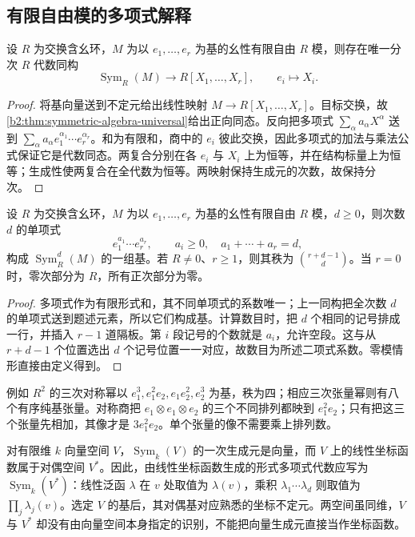\subsection{有限自由模的多项式解释}
\label{b2:subsec:0803:02}

\begin{theorem}[多项式解释]\label{b2:thm:symmetric-polynomial-algebra}
	设 \(R\) 为交换含幺环，\(M\) 为以 \(e_1,\ldots,e_r\) 为基的幺性有限自由 \(R\) 模，则存在唯一分次 \(R\) 代数同构
	\[
		\operatorname{Sym}_R(M)\longrightarrow R[X_1,\ldots,X_r], \qquad e_i\longmapsto X_i.
	\]
\end{theorem}
\begin{proof}
	将基向量送到不定元给出线性映射 \(M\rightarrow R[X_1,\ldots,X_r]\)。目标交换，故\cref{b2:thm:symmetric-algebra-universal}给出正向同态。反向把多项式 \(\sum_\alpha a_\alpha X^\alpha\) 送到 \(\sum_\alpha a_\alpha e_1^{\alpha_1}\cdots e_r^{\alpha_r}\)。和为有限和，商中的 \(e_i\) 彼此交换，因此多项式的加法与乘法公式保证它是代数同态。两复合分别在各 \(e_i\) 与 \(X_i\) 上为恒等，并在结构标量上为恒等；生成性使两复合在全代数为恒等。两映射保持生成元的次数，故保持分次。
\end{proof}

\begin{proposition}\label{b2:prop:symmetric-power-basis}
	设 \(R\) 为交换含幺环，\(M\) 为以 \(e_1,\ldots,e_r\) 为基的幺性有限自由 \(R\) 模，\(d\ge0\)，则次数 \(d\) 的单项式
	\[
		e_1^{a_1}\cdots e_r^{a_r},\qquad a_i\ge0,\quad a_1+\cdots+a_r=d,
	\]
	构成 \(\operatorname{Sym}_R^d(M)\) 的一组基。若 \(R\ne0\)、\(r\ge1\)，则其秩为 \(\binom{r+d-1}{d}\)。当 \(r=0\) 时，零次部分为 \(R\)，所有正次部分为零。
\end{proposition}
\begin{proof}
	多项式作为有限形式和，其不同单项式的系数唯一；上一同构把全次数 \(d\) 的单项式送到题述元素，所以它们构成基。计算数目时，把 \(d\) 个相同的记号排成一行，并插入 \(r-1\) 道隔板。第 \(i\) 段记号的个数就是 \(a_i\)，允许空段。这与从 \(r+d-1\) 个位置选出 \(d\) 个记号位置一一对应，故数目为所述二项式系数。零模情形直接由定义得到。
\end{proof}

例如 \(R^2\) 的三次对称幂以 \(e_1^3,e_1^2e_2,e_1e_2^2,e_2^3\) 为基，秩为四；相应三次张量幂则有八个有序纯基张量。对称商把 \(e_1\otimes e_1\otimes e_2\) 的三个不同排列都映到 \(e_1^2e_2\)；只有把这三个张量先相加，其像才是 \(3e_1^2e_2\)。单个张量的像不需要乘上排列数。

\ProseParagraphBreak
对有限维 \(k\) 向量空间 \(V\)，\(\operatorname{Sym}_k(V)\) 的一次生成元是向量，而 \(V\) 上的线性坐标函数属于对偶空间 \(V^*\)。因此，由线性坐标函数生成的形式多项式代数应写为 \(\operatorname{Sym}_k(V^*)\)：线性泛函 \(\lambda\) 在 \(v\) 处取值为 \(\lambda(v)\)，乘积 \(\lambda_1\cdots\lambda_d\) 则取值为 \(\prod_j\lambda_j(v)\)。选定 \(V\) 的基后，其对偶基对应熟悉的坐标不定元。两空间虽同维，\(V\) 与 \(V^*\) 却没有由向量空间本身指定的识别，不能把向量生成元直接当作坐标函数。

